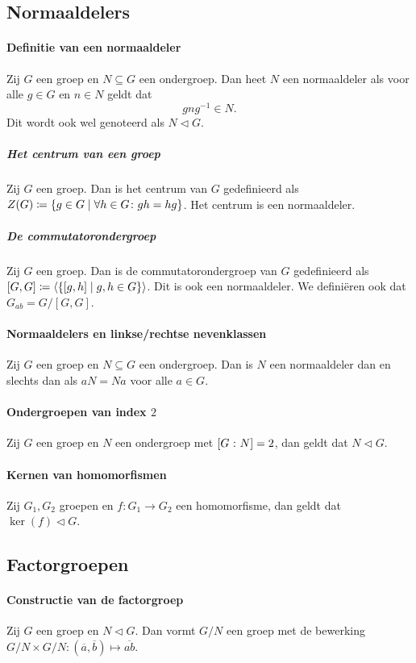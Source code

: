\subsection{Normaaldelers}
\paragraph{Definitie van een normaaldeler} Zij \(G\) een groep en \(N\subseteq G\) een ondergroep. Dan heet \(N\) een normaaldeler als voor alle \(g\in G\) en \(n\in N\) geldt dat
\[
    gng^{-1}\in N.
\]
Dit wordt ook wel genoteerd als \(N\triangleleft G\).

\subparagraph{Het centrum van een groep} Zij \(G\) een groep. Dan is het centrum van \(G\) gedefinieerd als \(Z(G)\coloneqq\{g\in G\mid \forall h\in G\colon gh=hg\}\). Het centrum is een normaaldeler.

\subparagraph{De commutatorondergroep} Zij \(G\) een groep. Dan is de commutatorondergroep van \(G\) gedefinieerd als \([G,G]\coloneqq\left\langle\{[g,h]\mid g,h\in G\}\right\rangle\). Dit is ook een normaaldeler. We definiëren ook dat \(G_{ab}=G/[G,G]\).

\paragraph{Normaaldelers en linkse/rechtse nevenklassen} Zij \(G\) een groep en \(N\subseteq G\) een ondergroep. Dan is \(N\) een normaaldeler dan en slechts dan als \(aN=Na\) voor alle \(a\in G\).

\paragraph{Ondergroepen van index \(2\)} Zij \(G\) een groep en \(N\) een ondergroep met \(\left[G\>\colon N\right]=2\), dan geldt dat \(N\triangleleft G\).

\paragraph{Kernen van homomorfismen} Zij \(G_{1},G_{2}\) groepen en \(f\colon G_{1}\to G_{2}\) een homomorfisme, dan geldt dat \(\ker(f)\triangleleft G\).

\subsection{Factorgroepen}
\paragraph{Constructie van de factorgroep} Zij \(G\) een groep en \(N\triangleleft G\). Dan vormt \(G/N\) een groep met de bewerking \(G/N\times G/N\colon (\overline{a},\overline{b})\mapsto \overline{ab}\).

